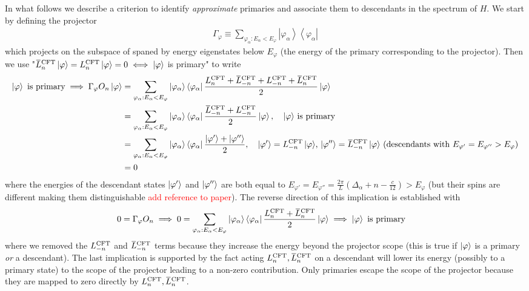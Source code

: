 \documentclass[10pt, a4paper]{article}
\begin{document}
{\begin{enumerate}
  In what follows we describe a criterion to identify \textit{approximate} primaries and associate them to descendants in the spectrum of $H$. We start by defining the projector
  \begin{align*}
    \Gamma_{\varphi} \equiv \sum_{\varphi_\alpha: E_\alpha<E_{\varphi}}\left|\varphi_\alpha\right\rangle\left\langle\varphi_\alpha\right|
  \end{align*}
  which projects on the subspace of spaned by energy eigenstates below $E_\varphi$ (the energy of the primary corresponding to the projector). Then we use "$\bar{L}_{n}^{\rm CFT} \ket{\varphi} = L_{n}^{\rm CFT} \ket{\varphi} = 0 \iff \ket{\varphi}$ is primary" to write 
  \begin{align*}
    \ket{\varphi} \text{ is primary} \implies \Gamma_{\varphi} O_n \ket{\varphi} &= \sum_{\varphi_\alpha: E_\alpha<E_{\varphi}}\left|\varphi_\alpha\right\rangle\left\langle\varphi_\alpha\right|\frac{L_n^{\rm C F T}+\bar{L}_{-n}^{\rm C F T}+L_{-n}^{\rm C F T}+\bar{L}_n^{\rm C F T}}{2} \ket{\varphi} \\
    &=  \sum_{\varphi_\alpha: E_\alpha<E_{\varphi}}\left|\varphi_\alpha\right\rangle\left\langle\varphi_\alpha\right|\frac{\bar{L}_{-n}^{\rm C F T}+L_{-n}^{\rm C F T}}{2} \ket{\varphi}, \quad \text{$\ket{\varphi}$ is primary}\\
    &= \sum_{\varphi_\alpha: E_\alpha<E_{\varphi}}\left|\varphi_\alpha\right\rangle\left\langle\varphi_\alpha\right| \frac{\ket{\varphi'} + \ket{\varphi''}}{2}, \quad \text{$\ket{\varphi'} = L_{-n}^{\rm C F T} \ket{\varphi}$, $\ket{\varphi''} = \bar{L}_{-n}^{\rm C F T} \ket{\varphi}$ (descendants with $E_{\varphi'} = E_{\varphi''} > E_{\varphi}$)}\\
    &= 0 
  \end{align*}
  where the energies of the descendant states $\ket{\varphi'}$ and $\ket{\varphi''}$ are both equal to $E_{\varphi'} = E_{\varphi''} = \frac{2\pi}{L} (\Delta_\alpha + n - \frac{c}{12}) > E_\varphi$ (but their spins are different making them distinguishable \textcolor{red}{add reference to paper}). 
  \newpage 
  The reverse direction of this implication is established with 
  \begin{align*}
    0 &= \Gamma_{\varphi} O_n \implies 0 = \sum_{\varphi_\alpha: E_\alpha<E_{\varphi}}\left|\varphi_\alpha\right\rangle\left\langle\varphi_\alpha\right|\frac{L_n^{\rm C F T} + \bar{L}_n^{\rm C F T}}{2} \ket{\varphi} \implies \ket{\varphi} \text{ is primary}
  \end{align*}
  where we removed the $L_{-n}^{\rm C F T}$ and $\bar{L}_{-n}^{\rm C F T}$ terms because they increase the energy beyond the projector scope (this is true if $\ket{\varphi}$ is a primary \textit{or} a descendant). The last implication is supported by the fact acting $L_n^{\rm C F T}, \bar{L}_n^{\rm C F T}$ on a descendant will lower its energy (possibly to a primary state) to the scope of the projector leading to a non-zero contribution. Only primaries escape the scope of the projector because they are mapped to zero directly by $L_n^{\rm C F T}, \bar{L}_n^{\rm C F T}$.\\
  

\end{enumerate}}
\end{document}

